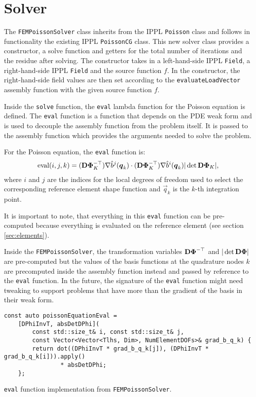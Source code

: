 \section{Solver}
\label{sec:solver}

The \texttt{FEMPoissonSolver} class inherits from the IPPL \texttt{Poisson} class and follows in functionality
the existing IPPL \texttt{PoissonCG} class.
This new solver class provides a constructor, a solve function and getters for the total number
of iterations and the residue after solving.
The constructor takes in a left-hand-side IPPL \texttt{Field}, a right-hand-side IPPL \texttt{Field} and the source function $f$.
In the constructor, the right-hand-side field values are then set according to the
\texttt{evaluateLoadVector} assembly function with the given source function $f$.

Inside the \texttt{solve} function, the \texttt{eval} lambda function for the Poisson equation is defined.
The \texttt{eval} function is a function that depends on the PDE weak form and is used to decouple the
assembly function from the problem itself. It is passed to the assembly function which
provides the arguments needed to solve the problem.

For the Poisson equation, the \texttt{eval} function is:
\begin{align}
    \text{eval}(i, j, k) = (\mathbf{D \Phi}_K^{-\top}) \nabla \hat{b}^j(\boldsymbol{q}_k) \cdot
    (\mathbf{D \Phi}_K^{-\top}) \nabla \hat{b}^i(\boldsymbol{q}_k)
    |\det \mathbf{D \Phi}_K|,
\end{align}
where $i$ and $j$ are the indices for the local degrees of freedom used
to select the corresponding reference element shape function and
$\vec{q}_k$ is the $k$-th integration point.

It is important to note, that everything in this \texttt{eval} function can be pre-computed because
everything is evaluated on the reference element (see section \ref{sec:elements}).

Inside the \texttt{FEMPoissonSolver}, the transformation variables $\mathbf{D \Phi}^{-\top}$
and $|\det \mathbf{D \Phi}|$ are pre-computed but the values of the basis functions
at the quadrature nodes $k$ are precomputed inside the assembly function instead
and passed by reference to the \texttt{eval} function.
In the future, the signature of the \texttt{eval} function might need tweaking to support
problems that have more than the gradient of the basis in their weak form.

\begin{Code}
    \begin{verbatim}
const auto poissonEquationEval =
    [DPhiInvT, absDetDPhi](
        const std::size_t& i, const std::size_t& j,
        const Vector<Vector<Tlhs, Dim>, NumElementDOFs>& grad_b_q_k) {
        return dot((DPhiInvT * grad_b_q_k[j]), (DPhiInvT * grad_b_q_k[i])).apply()
                * absDetDPhi;
    };
\end{verbatim}
    \caption{\texttt{eval} function implementation from \texttt{FEMPoissonSolver}.}
\end{Code}

